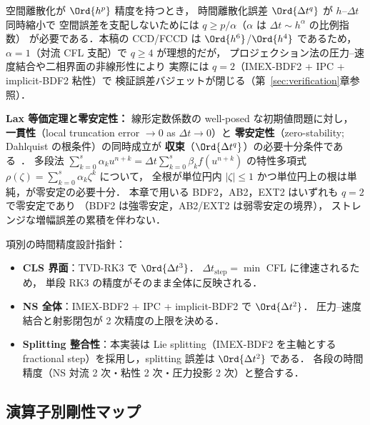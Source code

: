空間離散化が $\Ord{h^p}$ 精度を持つとき，
時間離散化誤差 $\Ord{\Delta t^q}$ が $h$--$\Delta t$ 同時縮小で
空間誤差を支配しないためには $q \ge p/\alpha$（$\alpha$ は $\Delta t\sim h^\alpha$ の比例指数）
が必要である．本稿の CCD/FCCD は $\Ord{h^6}$/$\Ord{h^4}$ であるため，
$\alpha = 1$（対流 CFL 支配）で $q \ge 4$ が理想的だが，
プロジェクション法の圧力--速度結合や二相界面の非線形性により
実際には $q = 2$（IMEX-BDF2 + IPC + implicit-BDF2 粘性）で
検証誤差バジェットが閉じる（第~\ref{sec:verification}章参照）．

\noindent\textbf{Lax 等価定理と零安定性：}
線形定数係数の well-posed な初期値問題に対し，
\textbf{一貫性}（local truncation error $\to 0$ as $\Delta t \to 0$）と
\textbf{零安定性}（zero-stability; Dahlquist の根条件）の同時成立が
\textbf{収束}（$\Ord{\Delta t^q}$）の必要十分条件である~\cite{HairerWanner1996}．
多段法 $\sum_{k=0}^{s}\alpha_k u^{n+k} = \Delta t \sum_{k=0}^{s}\beta_k f(u^{n+k})$
の特性多項式 $\rho(\zeta) = \sum_{k=0}^{s}\alpha_k \zeta^k$ について，
全根が単位円内 $|\zeta|\le 1$ かつ単位円上の根は単純，が零安定の必要十分．
本章で用いる BDF2，AB2，EXT2 はいずれも $q=2$ で零安定であり
（BDF2 は強零安定，AB2/EXT2 は弱零安定の境界），
ストレンジな増幅誤差の累積を伴わない．

項別の時間精度設計指針：

\begin{itemize}[leftmargin=2em]
  \item \textbf{CLS 界面}：TVD-RK3 で $\Ord{\Delta t^3}$．
        $\Delta t_{\text{step}}=\min$ CFL に律速されるため，
        単段 RK3 の精度がそのまま全体に反映される．
  \item \textbf{NS 全体}：IMEX-BDF2 + IPC + implicit-BDF2 で $\Ord{\Delta t^2}$．
        圧力--速度結合と射影閉包が 2 次精度の上限を決める．
  \item \textbf{Splitting 整合性}：本実装は Lie splitting（IMEX-BDF2 を主軸とする
        fractional step）を採用し，splitting 誤差は $\Ord{\Delta t^2}$ である．
        各段の時間精度（NS 対流 2 次・粘性 2 次・圧力投影 2 次）と整合する．
\end{itemize}

\subsection{演算子別剛性マップ}
\label{sec:time_operator_stiffness}

